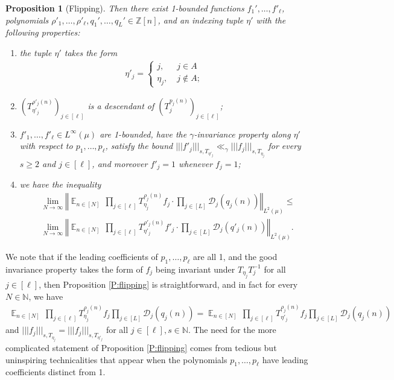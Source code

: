 \documentclass[11pt]{amsart}
\newtheorem{proposition}[lemma]{Proposition}
\theoremstyle{definition}
\newcommand{\N}{{\mathbb N}}
\newcommand{\Z}{{\mathbb Z}}
\newcommand{\CD}{{\mathcal D}}
\newcommand{\norm}[1]{\left\Vert #1\right\Vert}
\newcommand{\nnorm}[1]{\lvert\!|\!| #1|\!|\!\rvert}
\DeclareMathOperator*{\E}{\mathbb{E}}
\newcommand{\brac}[1]{\mathopen{}\left( #1 \mathclose{}\right)}
\begin{document}
\begin{proposition}[Flipping]
Then there exist 1-bounded functions $f_1', \ldots, f'_{\ell}$, polynomials $\rho'_1, \ldots, \rho'_{\ell}, q_1', \ldots, q_L'\in\Z[n]$, and an indexing tuple $\eta'$ with the following properties:
\begin{enumerate}
    \item the tuple $\eta'$ takes the form
    \begin{align*}
        \eta'_j = \begin{cases} j,\; &j\in A\\ \eta_j,\; &j\notin A;
        \end{cases}
    \end{align*}
    \item  $\brac{T_{\eta'_j}^{\rho'_j(n)}}_{j\in[\ell]}$ is a descendant of $\brac{T_j^{p_j(n)}}_{j\in[\ell]}$;
    \item $f'_1, \ldots, f'_{\ell}\in L^\infty(\mu)$ are 1-bounded, have the $\gamma$-invariance property along $\eta'$ with respect to $p_1, \ldots, p_\ell$, satisfy the bound $\nnorm{f'_j}_{s, T_{\eta'_j}}\ll_\gamma \nnorm{f_j}_{s, T_{\eta_{j}}}$ for every $s\geq 2$ and $j\in[\ell]$, and moreover $f'_j = 1$ whenever $f_j = 1$; %
    \item we have the inequality
    \begin{align}\label{E:flipping}
    &\lim_{N\to\infty}\norm{\E_{n\in [N]} \,\prod_{j\in[\ell]}T_{{\eta_{j}}}^{\rho_{j}(n)}f_{j} \cdot \prod_{j\in[L]}\CD_{j}(q_{j}(n))}_{L^2(\mu)}\leq \\
    \nonumber
    & \lim_{N\to\infty}\norm{\E_{n\in [N]} \,\prod_{j\in[\ell]}T_{{\eta'_j}}^{\rho'_j(n)}f'_j \cdot\prod_{j\in[L]}\CD_{j}(q'_j(n))}_{L^2(\mu)}.
\end{align}
\end{enumerate}
\end{proposition}
We note that if the leading coefficients of $p_1, \ldots, p_\ell$ are all 1, and the good invariance property takes the form of $f_j$ being invariant under $T_{\eta_j}T_j^{-1}$ for all $j\in[\ell]$, then Proposition \ref{P:flipping} is straightforward, and in fact for every $N\in\N$, we have
\begin{align*}
    \E_{n\in [N]} \,\prod_{j\in[\ell]}T_{{\eta_{j}}}^{\rho_{j}(n)}f_{j} \prod_{j\in[L]}\CD_{j}(q_{j}(n))=\E_{n\in [N]} \,\prod_{j\in[\ell]}T_{\eta'_j}^{\rho_{j}(n)}f_{j} \prod_{j\in[L]}\CD_{j}(q_{j}(n))
\end{align*}
and $\nnorm{f_j}_{s, T_{\eta_j}} = \nnorm{f_j}_{s, T_{\eta'_j}}$ for all $j\in[\ell], s\in\N$.
The need for the more complicated statement of Proposition \ref{P:flipping} comes from tedious but uninspiring technicalities that appear when the polynomials $p_1, \ldots, p_\ell$ have  leading coefficients distinct from 1.
\end{document}
